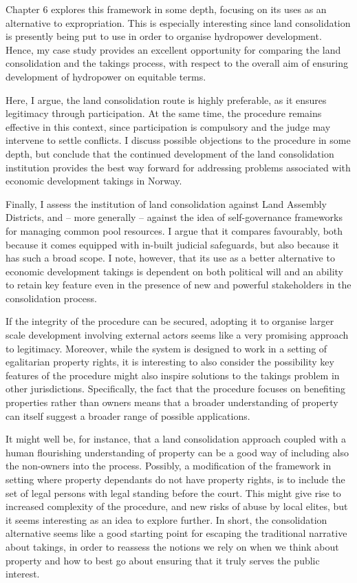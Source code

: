 Chapter 6 explores this framework in some depth, focusing on its uses as an alternative to expropriation. This is especially interesting since land consolidation is presently being put to use in order to organise hydropower development. Hence, my case study provides an excellent opportunity for comparing the land consolidation and the takings process, with respect to the overall aim of ensuring development of hydropower on equitable terms. 

Here, I argue, the land consolidation route is highly preferable, as it ensures legitimacy through participation. At the same time, the procedure remains effective in this context, since participation is compulsory and the judge may intervene to settle conflicts. I discuss possible objections to the procedure in some depth, but conclude that the continued development of the land consolidation institution provides the best way forward for addressing problems associated with economic development takings in Norway.

Finally, I assess the institution of land consolidation against Land Assembly Districts, and -- more generally -- against the idea of self-governance frameworks for managing common pool resources. I argue that it compares favourably, both because it comes equipped with in-built judicial safeguards, but also because it has such a broad scope. I note, however, that its use as a better alternative to economic development takings is dependent on both political will and an ability to retain key feature even in the presence of new and powerful stakeholders in the consolidation process.

If the integrity of the procedure can be secured, adopting it to organise larger scale development involving external actors seems like a very promising approach to legitimacy. Moreover, while the system is designed to work in a setting of egalitarian property rights, it is interesting to also consider the possibility key features of the procedure might also inspire solutions to the takings problem in other jurisdictions. Specifically, the fact that the procedure focuses on benefiting properties rather than owners means that a broader understanding of property can itself suggest a broader range of possible applications. 

It might well be, for instance, that a land consolidation approach coupled with a human flourishing understanding of property can be a good way of including also the non-owners into the process. Possibly, a modification of the framework in setting where property dependants do not have property rights, is to include the set of legal persons with legal standing before the court. This might give rise to increased complexity of the procedure, and new risks of abuse by local elites, but it seems interesting as an idea to explore further. In short, the consolidation alternative seems like a good starting point for escaping the traditional narrative about takings, in order to reassess the notions we rely on when we think about property and how to best go about ensuring that it truly serves the public interest.

